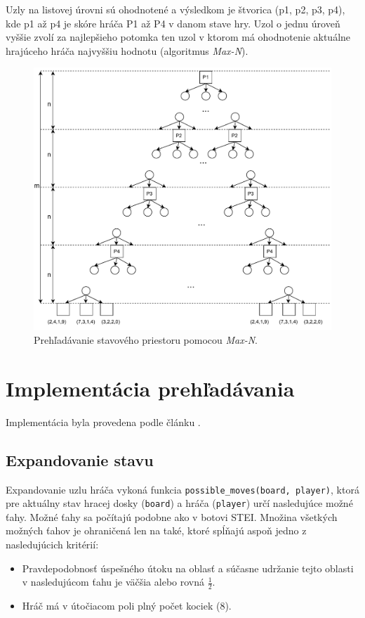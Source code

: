 \documentclass[a4paper, 11pt]{article}
\begin{document}
Uzly na listovej úrovni sú ohodnotené a výsledkom je štvorica (p1, p2, p3, p4), kde p1 až p4 je skóre hráča P1 až P4 v danom stave hry. Uzol o jednu úroveň vyššie zvolí za najlepšieho potomka ten uzol v ktorom má ohodnotenie aktuálne hrajúceho hráča najvyššiu hodnotu (algoritmus \textit{Max-N}).

\begin{figure}[bt]
	\centering
	\includegraphics[width=.6\textwidth]{figures/sui-dfs.pdf}
	\caption{Prehľadávanie stavového priestoru pomocou \textit{Max-N}.}
	\label{img:dfs}
\end{figure}

\section{Implementácia prehľadávania}

Implementácia byla provedena podle článku \cite{expecti}.

\subsection{Expandovanie stavu}
Expandovanie uzlu hráča vykoná funkcia \texttt{possible\_moves(board, player)}, ktorá pre aktuálny stav hracej dosky (\texttt{board}) a hráča (\texttt{player}) určí nasledujúce možné ťahy. Možné ťahy sa počítajú podobne ako v botovi STEI. Množina všetkých možných ťahov je ohraničená len na také, ktoré spĺňajú aspoň jedno z nasledujúcich kritérií:
\begin{itemize}
	\item Pravdepodobnosť úspešného útoku na oblasť a súčasne udržanie tejto oblasti v nasledujúcom ťahu je väčšia alebo rovná $\frac{1}{2}$.
	\item Hráč má v útočiacom poli plný počet kociek (8).
\end{itemize}
\end{document}
